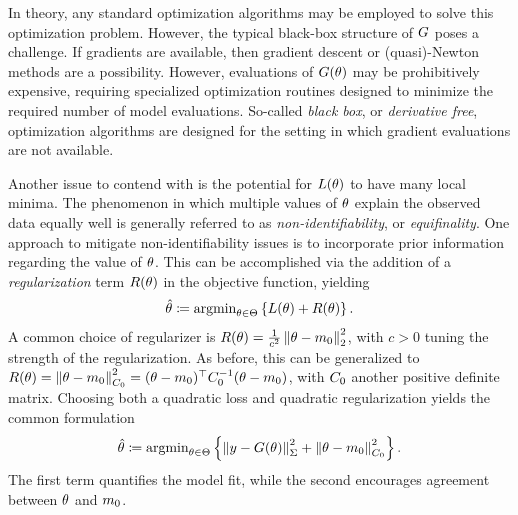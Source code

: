 \documentclass[12pt]{article}
\begin{document}
In theory, any standard optimization algorithms may be employed to solve this optimization problem. However, 
the typical black-box structure of $G$ poses a challenge. If gradients are available, then gradient descent or 
(quasi)-Newton methods are a possibility. However, evaluations of $G(\theta)$ may be prohibitively expensive, 
requiring specialized optimization routines designed to minimize the required number of model evaluations. 
So-called \textit{black box}, or \textit{derivative free}, optimization algorithms are designed for the setting 
in which gradient evaluations are not available. 

Another issue to contend with is the potential for $L(\theta)$ to have many local minima. The phenomenon in which 
multiple values of $\theta$ explain the observed data equally well is generally referred to as \textit{non-identifiability}, 
or \textit{equifinality}. One approach to mitigate non-identifiability issues is to incorporate prior information regarding 
the value of $\theta$. This can be accomplished via the addition of a \textit{regularization} term $R(\theta)$ in 
the objective function, yielding 
\begin{align}
\hat{\theta} \coloneqq \text{argmin}_{\theta \in \Theta} \left\{L(\theta) + R(\theta) \right\}. \label{opt_reg}
\end{align}
A common choice of regularizer is $R(\theta) = \frac{1}{c^2} \left\lVert\theta - m_0\right\rVert_2^2$, with $c > 0$ tuning 
the strength of the regularization. As before, this can be generalized to 
$R(\theta) = \left\lVert\theta - m_0\right\rVert_{C_0}^2 = (\theta - m_0)^\top C_0^{-1} (\theta - m_0)$, 
with $C_0$ another positive definite matrix. 
Choosing both a quadratic loss and quadratic regularization yields the common formulation
\begin{align}
\hat{\theta} \coloneqq \text{argmin}_{\theta \in \Theta} \left\{\left\lVert y - G(\theta)\right\rVert^2_{\Sigma} + \left\lVert\theta - m_0\right\rVert_{C_0}^2\right\}. \label{quadratic_opt}
\end{align}
The first term quantifies the model fit, while the second encourages agreement between $\theta$ and $m_0$.
\end{document}
